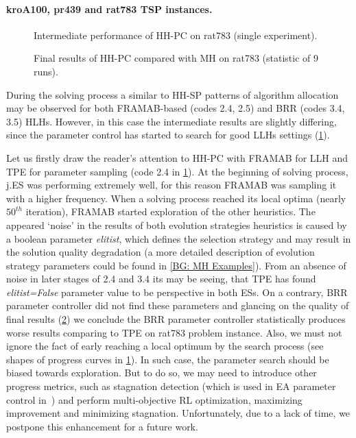 \paragraph{kroA100, pr439 and rat783 TSP instances.}
\begin{figure}[t]
	\centering
	\vspace{-20pt}
	
	\caption{Intermediate performance of HH-PC on rat783 (single experiment).}
	\vspace{-5pt}
	\label{eval:pict:hh-pc:rat783 intermediate}
\end{figure}

\begin{figure}[b]
	\centering
	\vspace{-20pt}
	
	\caption{Final results of HH-PC compared with MH on rat783 (statistic of 9 runs).}
	\vspace{-5pt}
	\label{eval:pict:hh-pc:rat783 final}
\end{figure}

During the solving process a similar to HH-SP patterns of algorithm allocation may be observed for both FRAMAB-based (codes 2.4, 2.5) and BRR (codes 3.4, 3.5) HLHs. However, in this case the intermediate results are slightly differing, since the parameter control has started to search for good LLHs settings (\cref{eval:pict:hh-pc:rat783 intermediate}). 

Let us firstly draw the reader's attention to HH-PC with FRAMAB for LLH and TPE for parameter sampling (code 2.4 in \cref{eval:pict:hh-pc:rat783 intermediate}). At the beginning of solving process, j.ES was performing extremely well, for this reason FRAMAB was sampling it with a higher frequency. When a solving process reached its local optima (nearly $50^{th}$ iteration), FRAMAB started exploration of the other heuristics. The appeared `noise' in the results of both evolution strategies heuristics is caused by a boolean parameter \emph{elitist}, which defines the selection strategy and may result in the solution quality degradation (a more detailed description of evolution strategy parameters could be found in \cref{BG: MH Examples}). From an absence of noise in later stages of 2.4 and 3.4 its may be seeing, that TPE has found \emph{elitist=False} parameter value to be perspective in both ESs. On a contrary, BRR parameter controller did not find these parameters and glancing on the quality of final results (\cref{eval:pict:hh-pc:rat783 final}) we conclude the BRR parameter controller statistically produces worse results comparing to TPE on rat783 problem instance. Also, we must not ignore the fact of early reaching a local optimum by the search process (see shapes of progress curves in \cref{eval:pict:hh-pc:rat783 intermediate}). In such case, the parameter search should be biased towards exploration. But to do so, we may need to introduce other progress metrics, such as stagnation detection (which is used in EA parameter control in~\cite{karafotias2014generic}) and perform multi-objective RL optimization, maximizing improvement and minimizing stagnation. Unfortunately, due to a lack of time, we postpone this enhancement for a future work.


